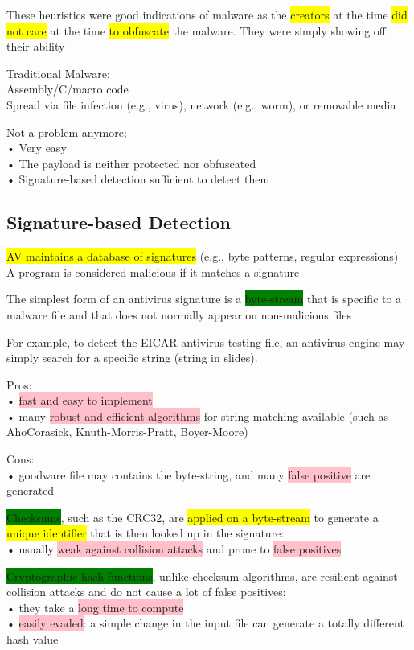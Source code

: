\documentclass[]{project_plan}
\begin{document}
These heuristics were good indications of malware as the \colorbox{yellow}{creators} at the time
\colorbox{yellow}{did not care} at the time \colorbox{yellow}{to obfuscate} the malware. They were simply showing off
their ability

Traditional Malware;\\
Assembly/C/macro code\\
Spread via file infection (e.g., virus), network (e.g., worm), or removable media

Not a problem anymore;\\
• Very easy\\
• The payload is neither protected nor obfuscated\\
• Signature-based detection sufficient to detect them

\subsection{Signature-based Detection}
\colorbox{yellow}{AV maintains a database of signatures} (e.g., byte patterns, regular expressions)\\
A program is considered malicious if it matches a signature

The simplest form of an antivirus signature is a \colorbox{green}{byte-stream} that is specific to a
malware file and that does not normally appear on non-malicious files

For example, to detect the EICAR antivirus testing file, an antivirus engine may simply
search for a specific string (string in slides).%

Pros:\\
• \colorbox{pink}{fast and easy to implement}\\
• many \colorbox{pink}{robust and efficient algorithms} for string matching available (such as AhoCorasick, Knuth-Morris-Pratt, Boyer-Moore)

Cons:\\
• goodware file may contains the byte-string, and many \colorbox{pink}{false positive} are generated

\colorbox{green}{Checksums}, such as the CRC32, are \colorbox{yellow}{applied on a byte-stream} to generate a \colorbox{yellow}{unique
  identifier} that is then looked up in the signature:\\
• usually \colorbox{pink}{weak against collision attacks} and prone to \colorbox{pink}{false positives}

\colorbox{green}{Cryptographic hash functions}, unlike checksum algorithms, are resilient against
collision attacks and do not cause a lot of false positives:\\
• they take a \colorbox{pink}{long time to compute}\\
• \colorbox{pink}{easily evaded}: a simple change in the input file can generate a totally different hash value
\end{document}
